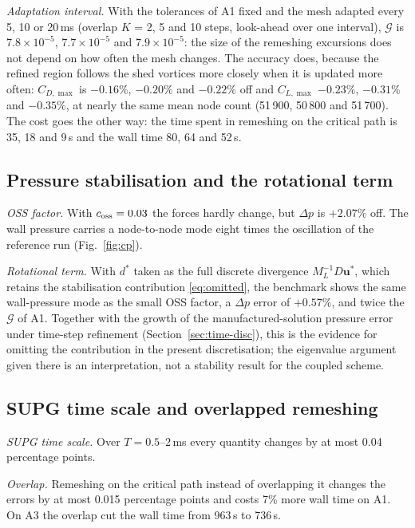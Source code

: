 \documentclass[preprint,12pt,number]{elsarticle}
\newcommand{\bu}{\mathbf{u}}
\begin{document}
\emph{Adaptation interval.} With the tolerances of A1 fixed and the mesh adapted every 5, 10
or 20\,ms (overlap $K$ = 2, 5 and 10 steps, look-ahead over one interval), $\mathcal{G}$ is
$7.8\times10^{-5}$, $7.7\times10^{-5}$ and $7.9\times10^{-5}$: the size of the remeshing
excursions does not depend on how often the mesh changes. The accuracy does, because the
refined region follows the shed vortices more closely when it is updated more often:
$C_{D,\max}$ is $-0.16\%$, $-0.20\%$ and $-0.22\%$ off and $C_{L,\max}$ $-0.23\%$, $-0.31\%$ and
$-0.35\%$, at nearly the same mean node count (51\,900, 50\,800 and 51\,700). The cost goes the
other way: the time spent in remeshing on the critical path is 35, 18 and 9\,s and the wall
time 80, 64 and 52\,s.

\subsection{Pressure stabilisation and the rotational term}

\emph{OSS factor.} With $c_{\rm oss} = 0.03$ the forces hardly change, but $\Delta p$ is
$+2.07\%$ off. The wall pressure carries a node-to-node mode eight times the oscillation of the
reference run (Fig.~\ref{fig:cp}).

\emph{Rotational term.} With $d^*$ taken as the full discrete divergence $M_L^{-1}D\bu^*$,
which retains the stabilisation contribution \eqref{eq:omitted}, the benchmark shows the same
wall-pressure mode as the small OSS factor, a $\Delta p$ error of $+0.57\%$, and twice the
$\mathcal{G}$ of A1. Together with the growth of the manufactured-solution pressure error under
time-step refinement (Section~\ref{sec:time-disc}), this is the evidence for omitting the
contribution in the present discretisation; the eigenvalue argument given there is an
interpretation, not a stability result for the coupled scheme.

\subsection{SUPG time scale and overlapped remeshing}

\emph{SUPG time scale.} Over $T = 0.5$--$2\,$ms every quantity changes by at most 0.04
percentage points.

\emph{Overlap.} Remeshing on the critical path instead of overlapping it changes the errors by
at most 0.015 percentage points and costs 7\% more wall time on A1. On A3 the overlap cut the
wall time from 963\,s to 736\,s.
\end{document}
